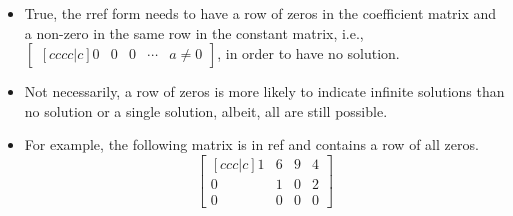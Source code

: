 \documentclass[basic]{inVerba-notes}
\begin{document}
\begin{enumerate}
\begin{enumerate}
\begin{itemize}
        \item True, the rref form needs to have a row of zeros in the coefficient matrix and a non-zero in the same row in the constant matrix, i.e., \(\begin{bmatrix}[cccc|c] 0 & 0 & 0 &\cdots & a \neq 0 \end{bmatrix}\), in order to have no solution. 
      \end{itemize}
    \begin{itemize}
      \item Not necessarily, a row of zeros is more likely to indicate infinite solutions than no solution or a single solution, albeit, all are still possible. 
      \item For example, the following matrix is in ref and contains a row of all zeros.
      \[%
      \begin{bmatrix}[ccc|c]
        1 & 6 & 9 & 4 \\
        0 & 1 & 0 & 2 \\
        0 & 0 & 0 & 0
      \end{bmatrix}
      \]%
    \end{itemize}
\end{enumerate}

\minor{\item 

}
\end{enumerate}
\end{document}
